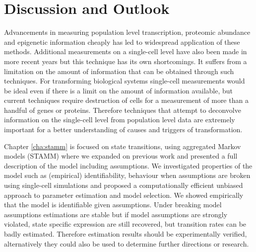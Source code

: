 
\chapter{Discussion and Outlook}
\label{cha:discussion-outlook}

Advancements in measuring population level transcription, proteomic abundance and epigenetic information cheaply has led to widespread application of these methods. Additional measurements on a single-cell level have also been made in more recent years \citep{Wheeler:2003ka, Dalerba:2011cc, Wang:2010ew} but this technique has its own shortcomings. It suffers from a limitation on the amount of information that can be obtained through such techniques. For transforming biological systems single-cell measurements would be ideal even if there is a limit on the amount of information available, but current techniques require destruction of cells for a measurement of more than a handful of genes or proteins. Therefore techniques that attempt to deconvolve information on the single-cell level from population level data are extremely important for a better understanding of causes and triggers of transformation.

Chapter \ref{cha:stamm} is focused on state transitions, using aggregated Markov models (STAMM) where we expanded on previous work \citep{Armond:2013} and presented a full description of the model including assumptions. We investigated properties of the model such as (empirical) identifiability, behaviour when assumptions are broken using single-cell simulations and proposed a computationally efficient unbiased approach to parameter estimation and model selection. We showed empirically that the model is identifiable given assumptions. Under breaking model assumptions estimations are stable but if model assumptions are strongly violated, state specific expression are still recovered, but transition rates can be badly estimated. Therefore estimation results should be experimentally verified, alternatively they could also be used to determine further directions or research.

